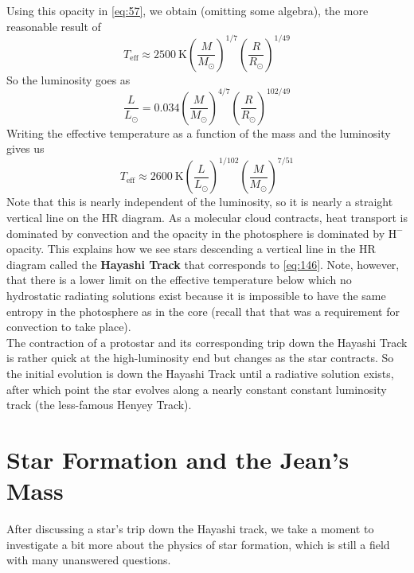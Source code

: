 \documentclass[10pt]{article}
\numberwithin{equation}{section}
\newcommand{\n}{\noindent}
\begin{document}
  Using this opacity in \eqref{eq:57}, we obtain (omitting some
  algebra), the more reasonable result of
  \begin{equation}
    \label{eq:144}
    T_{\mathrm{eff}}\approx 2500\ \mathrm{K}\left(\frac{M}{M_{\odot}}\right)^{1/7}\left(\frac{R}{R_\odot}\right)^{1/49}
  \end{equation}
  So the luminosity goes as
  \begin{equation}
    \label{eq:145}
    \frac{L}{L_\odot}=0.034\left(\frac{M}{M_\odot}\right)^{4/7}\left(\frac{R}{R_\odot}\right)^{102/49}
  \end{equation}
  Writing the effective temperature as a function of the mass and the
  luminosity gives us
  \begin{equation}
    \label{eq:146}
    T_{\mathrm{eff}}\approx 2600\ \mathrm{K}\left(\frac{L}{L_\odot}\right)^{1/102}\left(\frac{M}{M_\odot}\right)^{7/51}
  \end{equation}
  Note that this is nearly independent of the luminosity, so it is
  nearly a straight vertical line on the HR diagram. As a molecular
  cloud contracts, heat transport is dominated by convection and the
  opacity in the photosphere is dominated by $\mathrm{H}^{-}$
  opacity. This explains how we see stars descending a vertical line
  in the HR diagram called the \textbf{Hayashi Track} that corresponds
  to \eqref{eq:146}. Note, however, that there is a lower limit on the
  effective temperature below which no hydrostatic radiating solutions
  exist because it is impossible to have the same entropy in the
  photosphere as in the core (recall that that was a requirement for
  convection to take place).\\

  \n The contraction of a protostar and its corresponding trip down
  the Hayashi Track is rather quick at the high-luminosity end but
  changes as the star contracts. So the initial evolution is down the
  Hayashi Track until a radiative solution exists, after which point
  the star evolves along a nearly constant constant luminosity track
  (the less-famous Henyey Track).

\section{Star Formation and the Jean's Mass}
\label{sec:star-formation-jeans}
After discussing a star's trip down the Hayashi track, we take a
moment to investigate a bit more about the physics of star formation,
which is still a field with many unanswered questions.
\end{document}
